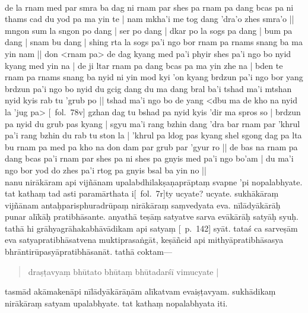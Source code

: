 \documentclass[12pt]{article}
\begin{document}
\textbf{\TVB}\\
de la rnam med par smra ba dag ni rnam par shes pa rnam pa dang bcas pa ni thams cad du yod pa ma yin te | nam mkha'i me tog dang 'dra'o zhes smra'o || mngon sum la sngon po dang | ser po dang | dkar po la sogs pa dang | bum pa dang | snam bu dang | shing rta la sogs pa'i ngo bor rnam pa rnams snang ba ma yin nam || don <rnam pa> de dag kyang med pa'i phyir shes pa'i ngo bo nyid kyang med yin na | de ji ltar rnam pa dang bcas pa ma yin zhe na | bden te rnam pa rnams snang ba nyid ni yin mod kyi 'on kyang brdzun pa'i ngo bor yang brdzun pa'i ngo bo nyid du gcig dang du ma dang bral ba'i tshad ma'i mtshan nyid kyis rab tu 'grub po || tshad ma'i ngo bo de yang <dbu ma de kho na nyid la 'jug pa> [\TVB\ fol.\ 78v] gzhan dag tu bshad pa nyid kyis 'dir ma spros so | brdzun pa nyid du grub pas kyang | sgyu ma'i rang bzhin dang 'dra bar rnam par 'khrul pa'i rang bzhin du rab tu ston la | 'khrul pa ldog pas kyang shel sgong dag pa lta bu rnam pa med pa kho na don dam par grub par 'gyur ro || de bas na rnam pa dang bcas pa'i rnam par shes pa ni shes pa gnyis med pa'i ngo bo'am | du ma'i ngo bor yod do zhes pa'i rtog pa gnyis bsal ba yin no || \\

nanu nirākāram api vijñānam upalabdhilakṣaṇaprāptaṃ svapne 'pi nopalabhyate. tat kathaṃ tad asti paramārthata\footnoteB{
	paramārthata] \emd ; paramārtham \MS\ \EDD
} i[\MS\ fol.\ 7r]ty ucyate? ucyate. sukhākāraṃ vijñānam antaḥparisphuradrūpaṃ nirākāraṃ saṃvedyata eva. nīlādyākārāḥ punar alīkāḥ pratibhāsante. %
anyathā teṣāṃ satyatve sarva evākārāḥ satyāḥ syuḥ. tathā hi grāhyagrāhakabhāvādikam api satyaṃ [\EDD\ p.\ 142] syāt. tataś ca sarveṣām eva satyapratibhāsatvena muktiprasaṅgāt,\footnoteB{
	muktiprasaṅgāt] \EDD\ (\emd); yuktiprasaṅgāt \MS
} keṣāñcid api mithyāpratibhāsasya bhrāntirūpasyāpratibhāsanāt. tathā coktam—

\begin{quote}
	draṣṭavyaṃ\footnoteB{
		draṣṭavyaṃ] \EDD ; draṣṭavya \MS
	} bhūtato bhūtaṃ bhūtadarśī vimucyate |
\end{quote}

tasmād akāmakenāpi nīlādyākārāṇām alīkatvam evaiṣṭavyam. sukhādikaṃ nirākāraṃ\footnoteB{
	nirākāraṃ] \MS\ \EDD ; rnam pa brdzun pa \TIB\ (alīkākāraṃ)
} satyam upalabhyate. tat kathaṃ nopalabhyata iti.\\
\end{document}
